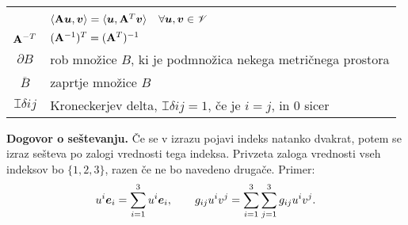 \begin{center}
\begin{tabular}[h]{|c|p{11cm}|}
	& $\langle\mathbf A\boldsymbol u,\boldsymbol v\rangle=\langle\boldsymbol u,\mathbf A^{T}\boldsymbol v\rangle$ \ $\forall\boldsymbol u,\boldsymbol v\in\mathscr V$ \\ %
	$\mathbf A^{-T}$ & $(\mathbf A^{-1})^{T}=(\mathbf A^{T})^{-1}$ \\ %
	$\partial B$ & rob množice $B$, ki je podmnožica nekega metričnega prostora \\ %
	$\overline{B}$ & zaprtje množice $B$ \\ %
	$\topbot{\delta}{i}{j}$ & Kroneckerjev delta, $\topbot{\delta}{i}{j}=1$, če je $i=j$, in 0 sicer \\ \hline
\end{tabular}\end{center}

\textbf{Dogovor o seštevanju.} Če se v izrazu pojavi indeks natanko dvakrat, potem
se izraz sešteva po zalogi vrednosti tega indeksa. Privzeta zaloga vrednosti
vseh indeksov bo $\{1,2,3\}$, razen če ne bo navedeno drugače. Primer:
\[
	u^i\boldsymbol e_i=\sum_{i=1}^3 u^i\boldsymbol e_i,\qquad
	g_{ij}u^iv^j=\sum_{i=1}^3\sum_{j=1}^3g_{ij}u^iv^j.
\]
